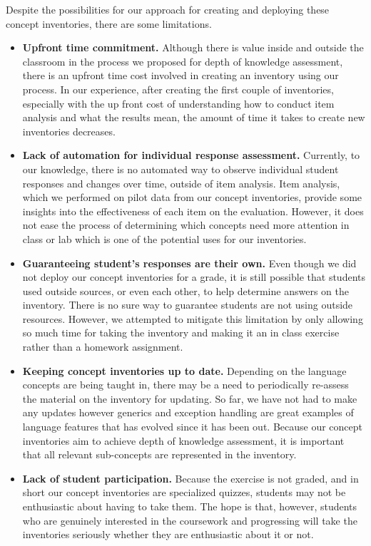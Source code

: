 Despite the possibilities for our approach for creating and deploying these concept inventories, there are some limitations. 

\begin{itemize}
	\item \textbf{Upfront time commitment.} Although there is value inside and outside the classroom in the process we proposed for depth of knowledge assessment, there is an upfront time cost involved in creating an inventory using our process. In our experience, after creating the first couple of inventories, especially with the up front cost of understanding how to conduct item analysis and what the results mean, the amount of time it takes to create new inventories decreases.
	\item \textbf{Lack of automation for individual response assessment.} Currently, to our knowledge, there is no automated way to observe individual student responses and changes over time, outside of item analysis. Item analysis, which we performed on pilot data from our concept inventories, provide some insights into the effectiveness of each item on the evaluation. However, it does not ease the process of determining which concepts need more attention in class or lab which is one of the potential uses for our inventories.
	\item \textbf{Guaranteeing student's responses are their own.} Even though we did not deploy our concept inventories for a grade, it is still possible that students used outside sources, or even each other, to help determine answers on the inventory. There is no sure way to guarantee students are not using outside resources. However, we attempted to mitigate this limitation by only allowing so much time for taking the inventory and making it an in class exercise rather than a homework assignment.
	\item \textbf{Keeping concept inventories up to date.} Depending on the language concepts are being taught in, there may be a need to periodically re-assess the material on the inventory for updating. So far, we have not had to make any updates however generics and exception handling are great examples of language features that has evolved since it has been out. Because our concept inventories aim to achieve depth of knowledge assessment, it is important that all relevant sub-concepts are represented in the inventory.
	\item \textbf{Lack of student participation.} Because the exercise is not graded, and in short our concept inventories are specialized quizzes, students may not be enthusiastic about having to take them. The hope is that, however, students who are genuinely interested in the coursework and progressing will take the inventories seriously whether they are enthusiastic about it or not.

\end{itemize}
